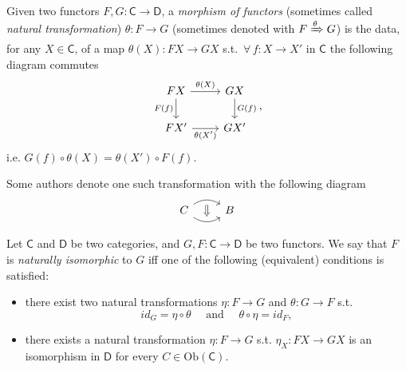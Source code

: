 \begin{defn}
	Given two functors $F,G: \mathsf{C} \to \mathsf{D}$, a {\em morphism of functors} (sometimes called {\em natural transformation}) $\theta: F \to G$ (sometimes denoted with $F \xRightarrow{\theta} G$) 
	is the data, for any $X \in \mathsf{C}$, of a map $\theta(X): FX \to GX$ s.t. $\,\forall\, f: X \to X'$ in $\mathsf{C}$ the following diagram commutes
	\begin{equation}
	\begin{tikzcd}
		FX \arrow[r, "{\theta(X)}", rightarrow] \arrow[d, "{F(f)}"', rightarrow] & GX \arrow[d, "{G(f)}", rightarrow] \\
		FX' \arrow[r, "{\theta(X')}"', rightarrow] & GX'
	\end{tikzcd}
	,\end{equation} 
	i.e. $G(f) \circ \theta(X) = \theta(X') \circ F(f)$.

	Some authors denote one such transformation with the following diagram
	\begin{equation}
	\begin{tikzcd}[row sep=tiny]
		C \arrow[r, ""{name=U, below}, rightarrow, bend left=35] 
		\arrow[r, ""{name=D}, rightarrow, bend right=35] &
		B
		\arrow[Rightarrow, from=U, to=D] 
	\end{tikzcd}
	\end{equation} 
\end{defn}

\begin{defn}
	Let $\mathsf{C}$ and $\mathsf{D}$ be two categories, and $G,F: \mathsf{C} \to \mathsf{D}$ be two functors.
	We say that $F$ is {\em naturally isomorphic} to $G$ iff one of the following (equivalent) conditions is satisfied:
	\begin{itemize}
		\item there exist two natural transformations $\eta: F \to G$ and $\theta: G \to F$ s.t.
			\begin{equation}
			id_G = \eta \circ \theta \quad \text{ and } \quad \theta \circ \eta = id_F
			,\end{equation} 
		\item there exists a natural transformation $\eta: F \to G$ s.t. $\eta_X: FX \to GX$ is an isomorphism in $\mathsf{D}$ for every $C \in \mathrm{Ob} \left(\mathsf{C}\right)$.
	\end{itemize}
\end{defn}

